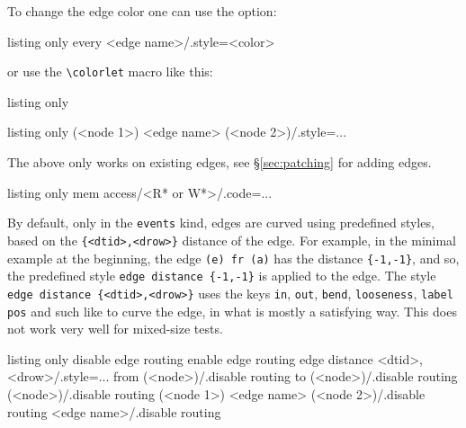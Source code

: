\documentclass[a4paper]{article}
\begin{document}
To change the edge color one can use the option:
\begin{tcblisting}{listing only}
every <edge name>/.style={<color>}
\end{tcblisting}
or use the \lstinline[language={[LaTeX]TeX},basicstyle=\footnotesize\ttfamily]|\colorlet| macro like this:
\begin{tcblisting}{listing only}
\end{tcblisting}

\begin{tcblisting}{listing only}
(<node 1>) <edge name> (<node 2>)/.style={...}
\end{tcblisting}
The above only works on existing edges, see \S\ref{sec:patching} for adding edges.

\begin{tcblisting}{listing only}
mem access/<R* or W*>/.code={...} %
\end{tcblisting}

By default, only in the \lstinline|events| kind, edges are curved using predefined
styles, based on the \lstinline|{<dtid>,<drow>}| distance of the edge.
For example, in the minimal example at the beginning, the edge
\lstinline|(e) fr (a)| has the distance \lstinline|{-1,-1}|, and so, the predefined
style \lstinline|edge distance {-1,-1}| is applied to the edge.
The style \lstinline|edge distance {<dtid>,<drow>}| uses the keys \lstinline|in|,
\lstinline|out|, \lstinline|bend|, \lstinline|looseness|, \lstinline|label pos| and such like
to curve the edge, in what is mostly a satisfying way.
This does not work very well for mixed-size tests.

\begin{tcblisting}{listing only}
disable edge routing
enable edge routing
edge distance {<dtid>,<drow>}/.style={...}
from (<node>)/.disable routing                     %
to (<node>)/.disable routing                       %
(<node>)/.disable routing                          %
(<node 1>) <edge name> (<node 2>)/.disable routing %
<edge name>/.disable routing                       %
\end{tcblisting}
\end{document}

